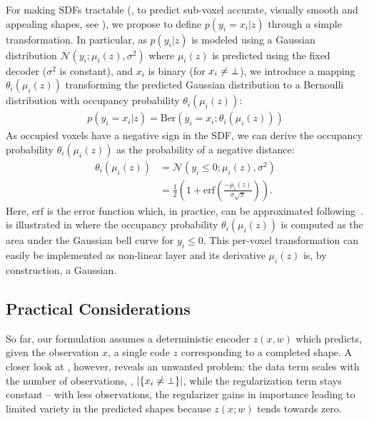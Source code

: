 For making SDFs tractable (\ie, to predict sub-voxel accurate, visually smooth and appealing shapes, see ), we propose to define $p(y_i = x_i | z)$ through a simple transformation. In particular, as $p(y_i | z)$ is modeled using a Gaussian distribution $\mathcal{N}(y_i ; \mu_i(z), \sigma^2)$ where $\mu_i(z)$ is predicted using the fixed decoder ($\sigma^2$ is constant), and $x_i$ is binary (for $x_i \neq \bot$), we introduce a mapping $\theta_i(\mu_i(z))$ transforming the predicted Gaussian distribution to a Bernoulli distribution with occupancy probability $\theta_i(\mu_i(z))$:
%
\begin{align}
p(y_i = x_i | z) = \text{Ber}(y_i = x_i; \theta_i(\mu_i(z)))
\end{align}
%
As occupied voxels have a negative sign in the SDF, we can derive the occupancy probability $\theta_i(\mu_i(z))$ as the probability of a negative distance:
%
\begin{align}
\theta_i(\mu_i(z)) &= \mathcal{N}(y_i \leq 0; \mu_i(z), \sigma^2)\\
&= \frac{1}{2} \left(1 + \text{erf}\left(\frac{- \mu_i(z)}{\sigma \sqrt{\pi}}\right)\right).\label{eq:sdf}
\end{align}
%
Here, $\text{erf}$ is the error function which, in practice, can be approximated following~\citep{Abramowitz1974}.  is illustrated in  where the occupancy probability $\theta_i(\mu_i(z))$ is computed as the area under the Gaussian bell curve for $y_i \leq 0$. This per-voxel transformation can easily be implemented as non-linear layer and its derivative \wrt $\mu_i(z)$
is, by construction, a Gaussian.

\subsection{Practical Considerations}

%
So far, our \AML formulation assumes a deterministic encoder $z(x,w)$ which predicts, given the observation $x$, a single code $z$ corresponding to a completed shape. A closer look at , however, reveals an unwanted problem: the data term scales with the number of observations, \ie, $|\{x_i \neq \bot\}|$, while the regularization term stays constant -- with less observations, the regularizer gains in importance leading to limited variety in the predicted shapes because $z(x; w)$ tends towards zero.

